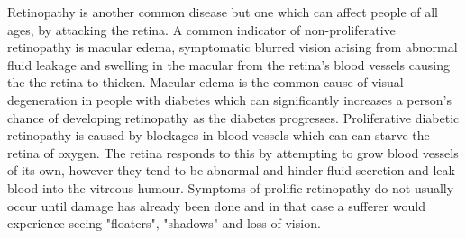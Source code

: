 Retinopathy is another common disease but one which can affect people of
all ages, by attacking the retina. A common indicator of non-proliferative
retinopathy is macular edema, symptomatic blurred vision arising from
abnormal fluid leakage and swelling in the macular from the retina's
blood vessels causing the the retina to thicken.\cite{hee1995quantitative}
Macular edema is the common cause of visual degeneration in people with
diabetes which can significantly increases a person's chance of developing
retinopathy as the diabetes progresses.\cite{klein1984wisconsin} Proliferative
diabetic retinopathy is caused by blockages in blood vessels which can can
starve the retina of oxygen. The retina responds to this by attempting to
grow blood vessels of its own, however they tend to be abnormal and hinder
fluid secretion and leak blood into the vitreous humour. Symptoms of
prolific retinopathy do not usually occur until damage has already been
done and in that case a sufferer would experience seeing "floaters",
"shadows" and loss of vision.





